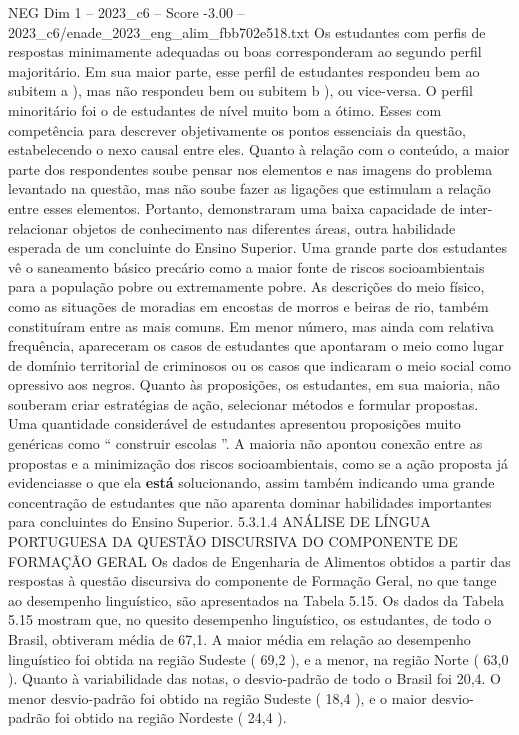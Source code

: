 \begin{textsample}{NEG Dim 1 – 2023\_c6 – Score -3.00 – 2023\_c6/enade\_2023\_eng\_alim\_fbb702e518.txt}
Os estudantes com perfis de respostas minimamente adequadas ou boas corresponderam ao segundo perfil majoritário.
Em sua maior parte, esse perfil de estudantes respondeu bem ao subitem a ), mas não respondeu bem ou subitem b ), ou vice-versa.
O perfil minoritário foi o de estudantes de nível muito bom a ótimo.
Esses com competência para descrever objetivamente os pontos essenciais da questão, estabelecendo o nexo causal entre eles.
Quanto à relação com o conteúdo, a maior parte dos respondentes soube pensar nos elementos e nas imagens do problema levantado na questão, mas não soube fazer as ligações que estimulam a relação entre esses elementos.
Portanto, demonstraram uma baixa capacidade de inter-relacionar objetos de conhecimento nas diferentes áreas, outra habilidade esperada de um concluinte do Ensino Superior.
Uma grande parte dos estudantes vê o saneamento básico precário como a maior fonte de riscos socioambientais para a população pobre ou extremamente pobre.
As descrições do meio físico, como as situações de moradias em encostas de morros e beiras de rio, também constituíram entre as mais comuns.
Em menor número, mas ainda com relativa frequência, apareceram os casos de estudantes que apontaram o meio como lugar de domínio territorial de criminosos ou os casos que indicaram o meio social como opressivo aos negros.
Quanto às proposições, os estudantes, em sua maioria, não souberam criar estratégias de ação, selecionar métodos e formular propostas.
Uma quantidade considerável de estudantes apresentou proposições muito genéricas como “ construir escolas ”.
A maioria não apontou conexão entre as propostas e a minimização dos riscos socioambientais, como se a ação proposta já evidenciasse o que ela \textbf{está} solucionando, assim também indicando uma grande concentração de estudantes que não aparenta dominar habilidades importantes para concluintes do Ensino Superior. 5.3.1.4 ANÁLISE DE LÍNGUA PORTUGUESA DA QUESTÃO DISCURSIVA DO COMPONENTE DE FORMAÇÃO GERAL Os dados de Engenharia de Alimentos obtidos a partir das respostas à questão discursiva do componente de Formação Geral, no que tange ao desempenho linguístico, são apresentados na Tabela 5.15.
Os dados da Tabela 5.15 mostram que, no quesito desempenho linguístico, os estudantes, de todo o Brasil, obtiveram média de 67,1.
A maior média em relação ao desempenho linguístico foi obtida na região Sudeste ( 69,2 ), e a menor, na região Norte ( 63,0 ).
Quanto à variabilidade das notas, o desvio-padrão de todo o Brasil foi 20,4.
O menor desvio-padrão foi obtido na região Sudeste ( 18,4 ), e o maior desvio-padrão foi obtido na região Nordeste ( 24,4 ).

\end{textsample}
